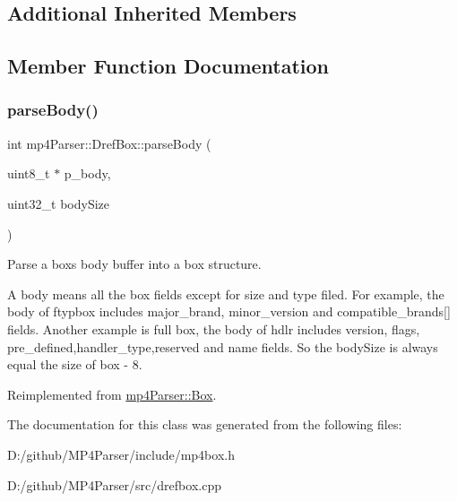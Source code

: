 \subsection*{Additional Inherited Members}


\subsection{Member Function Documentation}
\mbox{\label{classmp4_parser_1_1_dref_box_a47453502638fb6c179a0acae567396e4}} 
\subsubsection{\texorpdfstring{parseBody()}{parseBody()}}
{\footnotesize\ttfamily int mp4\+Parser\+::\+Dref\+Box\+::parse\+Body (\begin{DoxyParamCaption}\item[{uint8\+\_\+t $\ast$}]{p\+\_\+body,  }\item[{uint32\+\_\+t}]{body\+Size }\end{DoxyParamCaption})\hspace{0.3cm}{\ttfamily [virtual]}}



Parse a box\textquotesingle{}s body buffer into a box structure. 

A body means all the box fields except for size and type filed. For example, the body of ftypbox includes major\+\_\+brand, minor\+\_\+version and compatible\+\_\+brands\mbox{[}\mbox{]} fields. Another example is full box, the body of hdlr includes version, flags, pre\+\_\+defined,handler\+\_\+type,reserved and name fields. So the body\+Size is always equal the size of box -\/ 8. 

Reimplemented from \mbox{\hyperlink{classmp4_parser_1_1_box_a3dd0c084ac65bc77b69ac5ecaf796cb2}{mp4\+Parser\+::\+Box}}.



The documentation for this class was generated from the following files\+:\begin{DoxyCompactItemize}
\item 
D\+:/github/\+M\+P4\+Parser/include/mp4box.\+h\item 
D\+:/github/\+M\+P4\+Parser/src/drefbox.\+cpp\end{DoxyCompactItemize}
